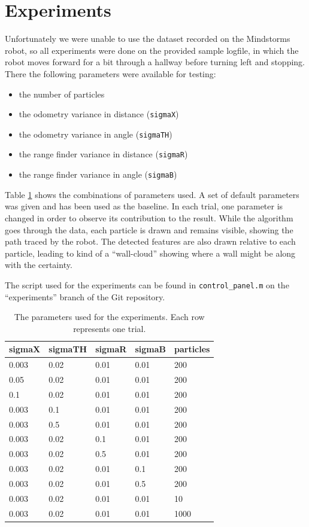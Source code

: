 \documentclass[a4paper, 12pt]{article}
\begin{document}
\section{Experiments}
Unfortunately we were unable to use the dataset recorded on the Mindstorms
robot, so all experiments were done on the provided sample logfile, in which the
robot moves forward for a bit through a hallway before turning left and
stopping. There the following parameters were available for testing:
\begin{itemize}
    \item the number of particles
    \item the odometry variance in distance (\texttt{sigmaX})
    \item the odometry variance in angle (\texttt{sigmaTH})
    \item the range finder variance in distance (\texttt{sigmaR})
    \item the range finder variance in angle (\texttt{sigmaB})
\end{itemize}

Table \ref{tbl:params} shows the combinations of parameters used. A set of
default parameters was given and has been used as the baseline. In each trial,
one parameter is changed in order to observe its contribution to the result.
While the algorithm goes through the data, each particle is drawn and remains
visible, showing the path traced by the robot. The detected features are also
drawn relative to each particle, leading to kind of a ``wall-cloud'' showing
where a wall might be along with the certainty.

The script used for the experiments can be found in \texttt{control\_panel.m} on
the ``experiments'' branch of the Git repository.

\begin{table}[htbp]
    \begin{tabular}{|l|l|l|l|l|}
    \hline
    sigmaX & sigmaTH & sigmaR & sigmaB & particles \\
    \hline
    0.003  & 0.02    & 0.01   & 0.01   & 200       \\
    0.05   & 0.02    & 0.01   & 0.01   & 200       \\
    0.1    & 0.02    & 0.01   & 0.01   & 200       \\
    0.003  & 0.1     & 0.01   & 0.01   & 200       \\
    0.003  & 0.5     & 0.01   & 0.01   & 200       \\
    0.003  & 0.02    & 0.1    & 0.01   & 200       \\
    0.003  & 0.02    & 0.5    & 0.01   & 200       \\
    0.003  & 0.02    & 0.01   & 0.1    & 200       \\
    0.003  & 0.02    & 0.01   & 0.5    & 200       \\
    0.003  & 0.02    & 0.01   & 0.01   & 10        \\
    0.003  & 0.02    & 0.01   & 0.01   & 1000      \\
    \hline
    \end{tabular}
    \caption{The parameters used for the experiments. Each row represents one
    trial.}
    \label{tbl:params}
\end{table}
\end{document}
